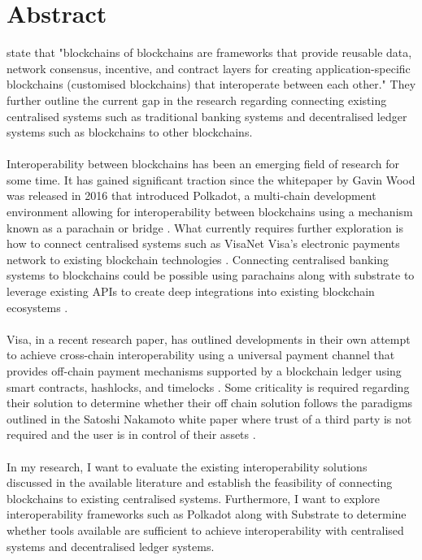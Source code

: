 \documentclass[12pt]{article}
\begin{document}
\section{Abstract}
\autocite{belchiorSurveyBlockchainInteroperability2021}
state that "blockchains of blockchains are frameworks that provide reusable data, network consensus, incentive,
and contract layers for creating application-specific blockchains (customised blockchains) that interoperate between each other."
They further outline the current gap in the research regarding connecting existing centralised systems such as traditional banking
systems and decentralised ledger systems such as blockchains to other blockchains.
\\\\
Interoperability between blockchains has been an emerging field of
research for some time. It has gained significant traction since the whitepaper by Gavin Wood was released in 2016 that introduced Polkadot,
a multi-chain development environment allowing for interoperability between blockchains using a mechanism known as a parachain or bridge \autocite{woodPOLKADOTVISIONHETEROGENEOUS2016}.
What currently requires further exploration is how to connect centralised systems such as VisaNet Visa's electronic payments network to existing blockchain technologies \autocite{VisaNetTechnologyVisa}.
Connecting centralised banking systems to blockchains could be possible using parachains along with substrate to leverage existing APIs to create deep integrations into existing blockchain ecosystems \autocite{polkadotPolkadotDecoded20202021}.
\\\\
Visa, in a recent research paper, has outlined developments in their own attempt to achieve cross-chain interoperability using a universal payment channel that provides off-chain payment mechanisms
supported by a blockchain ledger using smart contracts, hashlocks, and timelocks \autocite{christodorescuUniversalPaymentChannels2021}. Some criticality is required regarding their solution to determine whether their off chain solution follows the paradigms
outlined in the Satoshi Nakamoto white paper where trust of a third party is not required and the user is in control of their assets \autocite{nakamotoBitcoinPeertoPeerElectronic}.
\\\\
In my research, I want to evaluate the existing interoperability solutions discussed in the available literature and establish the feasibility of connecting blockchains to existing centralised systems.
Furthermore, I want to explore interoperability frameworks such as Polkadot along with Substrate to determine whether tools available are sufficient to achieve interoperability with centralised systems and decentralised ledger systems.
\end{document}
